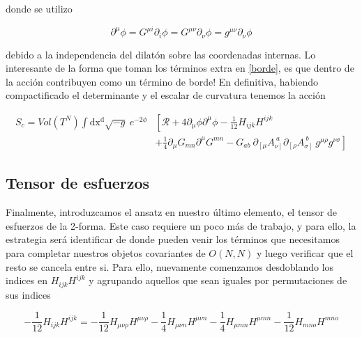 \documentclass{article}
\numberwithin{equation}{section}
\begin{document}
donde se utilizo 

\begin{equation}
\partial^{\mu} \phi = G^{\mu i} \partial_i \phi = G^{\mu \nu} \partial_{\nu} \phi = g^{\mu \nu} \partial_{\nu} \phi
\end{equation}

debido a la independencia del dilatón sobre las coordenadas internas. Lo interesante de la forma que toman los términos extra en \ref{borde}, es que dentro de la acción contribuyen como un término de borde! En definitiva, habiendo compactificado el determinante y el escalar de curvatura tenemos la acción

\begin{boxquation}
\begin{equation}\label{S_ricci}
\begin{aligned}
S_c =Vol \left(T^N\right) \int\mathrm{dx^d} \sqrt{-g} \ e^{-2\phi}&\left[\mathcal{R} + 4 \partial_{\mu}\phi\partial^{\mu} \phi   - \frac{1}{12} H_{i j k}H^{i j k} \right.\\
& \left. + \frac{1}{4} \partial_{\mu}{G_{m n}}\partial^{\mu} G^{m n} - G_{a b} \ \partial_{\left[\mu\right.} A_{\left.\nu\right]}^{\ a} \partial_{\left[\rho\right.} A_{\left.\sigma\right]}^{\ b} \ g^{\mu \rho} g^{\nu \sigma}\right]
\end{aligned}
\end{equation}
\end{boxquation}

\subsection{Tensor de esfuerzos}

Finalmente, introduzcamos el ansatz en nuestro último elemento, el tensor de esfuerzos de la 2-forma. Este caso requiere un poco más de trabajo, y para ello, la estrategia será identificar de donde pueden venir los términos que necesitamos para completar nuestros objetos covariantes de $ O(N,N) $ y luego verificar que el resto se cancela entre si. Para ello, nuevamente comenzamos desdoblando los indices en $ H_{i j k} H^{i j k} $ y agrupando aquellos que sean iguales por permutaciones de sus indices

\begin{equation}\label{H1}
- \frac{1}{12} H_{i j k} H^{i j k} = - \frac{1}{12} H_{\mu \nu \rho} H^{\mu \nu \rho} - \frac{1}{4} H_{\mu \nu n} H^{\mu \nu n} - \frac{1}{4} H_{\mu m n} H^{\mu m n} - \frac{1}{12} H_{m n o} H^{m n o}
\end{equation}
\end{document}
